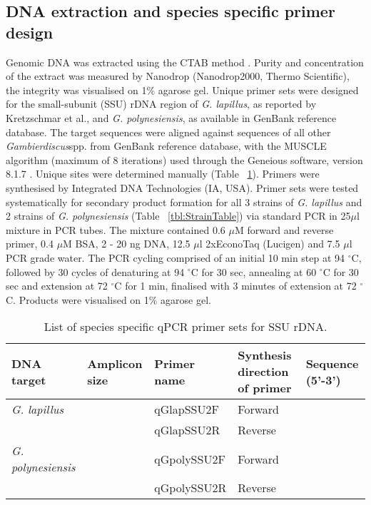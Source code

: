 \documentclass[12pt]{article}
\begin{document}
\subsection{DNA extraction and species specific primer design}
Genomic DNA was extracted using the CTAB method \citep{zhou1999analysis}. Purity and concentration of the extract was measured by Nanodrop (Nanodrop2000, Thermo Scientific), the integrity was visualised on 1\% agarose gel.
Unique primer sets were designed for the small-subunit (SSU) rDNA region of  \emph{G. lapillus}, as reported by Kretzschmar et al., and \emph{G. polynesiensis}, as available in GenBank reference database. The target sequences were aligned against sequences of all other \emph{Gambierdiscus}spp. from GenBank reference database, with the MUSCLE algorithm (maximum of 8 iterations) \citep{edgar2004muscle} used through the Geneious software, version 8.1.7 \citep{kearse2012geneious}. Unique sites were determined manually (Table ~\ref{tbl:PrimerTable}). Primers were synthesised by Integrated DNA Technologies (IA, USA).
Primer sets were tested systematically for secondary product formation for all 3 strains of \emph{G. lapillus} and 2 strains of \emph{G. polynesiensis} (Table ~\ref{tbl:StrainTable}) via standard PCR in 25$\mu$l mixture in PCR tubes. The mixture contained 0.6 $\mu$M forward and reverse primer, 0.4 $\mu$M BSA, 2 - 20 ng DNA, 12.5 $\mu$l 2xEconoTaq (Lucigen) and 7.5 $\mu$l PCR grade water.
The PCR cycling comprised of an initial 10 min step at 94 $^{\circ}$C, followed by 30 cycles of denaturing at 94 $^{\circ}$C for 30 sec, annealing at 60 $^{\circ}$C for 30 sec and extension at 72 $^{\circ}$C for 1 min, finalised with 3 minutes of extension at 72 $^{\circ}$C. Products were visualised on 1\% agarose gel.
\FloatBarrier
\begin{table}
\caption{List of species specific  qPCR primer sets for SSU rDNA.}
\label{tbl:PrimerTable}
\begin{tabular}{  | p{2cm} | p{2cm} | p{2cm} | p{2cm} | p{7cm} | }
\hline
\textbf{DNA target} & \textbf{Amplicon size} & \textbf{Primer name} & \textbf{Synthesis direction of primer} & \textbf{Sequence (5'-3')}  \\
  \hline
   \emph{G. lapillus}   & &qGlapSSU2F & Forward & \\
   \hline
 & &qGlapSSU2R & Reverse & \\
 \hline
\emph{G. polynesiensis}& &qGpolySSU2F& Forward & \\
 \hline
  & &qGpolySSU2R & Reverse &   \\
    \hline
 \end{tabular}
\end{table}
\end{document}
